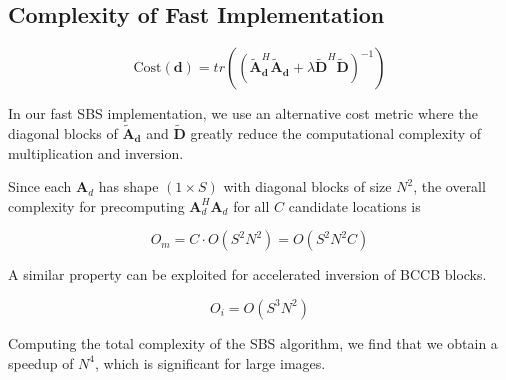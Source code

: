 \documentclass{article}
\begin{document}

\subsection{Complexity of Fast Implementation}

$$
\text{Cost}(\bm{d}) = tr\left(\left(
\widetilde{\bm A}_{\bm d}^H \widetilde{\bm A}_{\bm d} + \lambda \widetilde{\bm D}^H
\widetilde{\bm D} \right)^{-1} \right)
$$

In our fast SBS implementation, we use an alternative cost metric where the
diagonal blocks of $\widetilde{\bm{A}}_{\bm{d}}$ and $\widetilde{\bm{D}}$ greatly
  reduce the computational complexity of multiplication and inversion.

Since each $\bm{A}_d$ has shape $(1 \times S)$ with diagonal blocks of size $N^2$, the overall complexity for
precomputing $\bm{A}^H_d \bm{A}_d$ for all $C$ candidate locations is

$$
O_m = C \cdot O(S^2N^2) = O(S^2N^2C)
$$

A similar property can be exploited for accelerated inversion of BCCB blocks. \cite{kamaci2017}

$$
O_i = O(S^3N^2)
$$

Computing the total complexity of the SBS algorithm, we find that we obtain a
speedup of $N^4$, which is significant for large images.
\end{document}
